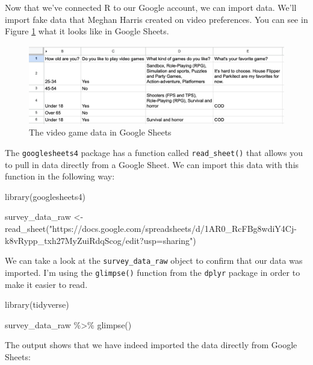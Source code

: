\documentclass[
]{book}
\newenvironment{Shaded}{\begin{snugshade}}{\end{snugshade}}
\newcommand{\FunctionTok}[1]{\textcolor[rgb]{0.00,0.00,0.00}{#1}}
\newcommand{\NormalTok}[1]{#1}
\newcommand{\OtherTok}[1]{\textcolor[rgb]{0.56,0.35,0.01}{#1}}
\newcommand{\SpecialCharTok}[1]{\textcolor[rgb]{0.00,0.00,0.00}{#1}}
\newcommand{\StringTok}[1]{\textcolor[rgb]{0.31,0.60,0.02}{#1}}
\begin{document}
Now that we've connected R to our Google account, we can import data. We'll import fake data that Meghan Harris created on video preferences. You can see in Figure \ref{fig:video-game-survey-data} what it looks like in Google Sheets.

\begin{figure}
\includegraphics[width=1\linewidth]{assets/video-game-survey-data} \caption{The video game data in Google Sheets}\label{fig:video-game-survey-data}
\end{figure}

The \texttt{googlesheets4} package has a function called \texttt{read\_sheet()} that allows you to pull in data directly from a Google Sheet. We can import this data with this function in the following way:

\begin{Shaded}
\begin{Highlighting}[]
\FunctionTok{library}\NormalTok{(googlesheets4)}

\NormalTok{survey\_data\_raw }\OtherTok{\textless{}{-}} \FunctionTok{read\_sheet}\NormalTok{(}\StringTok{"https://docs.google.com/spreadsheets/d/1AR0\_RcFBg8wdiY4Cj{-}k8vRypp\_txh27MyZuiRdqScog/edit?usp=sharing"}\NormalTok{)}
\end{Highlighting}
\end{Shaded}

We can take a look at the \texttt{survey\_data\_raw} object to confirm that our data was imported. I'm using the \texttt{glimpse()} function from the \texttt{dplyr} package in order to make it easier to read.

\begin{Shaded}
\begin{Highlighting}[]
\FunctionTok{library}\NormalTok{(tidyverse)}

\NormalTok{survey\_data\_raw }\SpecialCharTok{\%\textgreater{}\%} 
  \FunctionTok{glimpse}\NormalTok{()}
\end{Highlighting}
\end{Shaded}

The output shows that we have indeed imported the data directly from Google Sheets:
\end{document}
